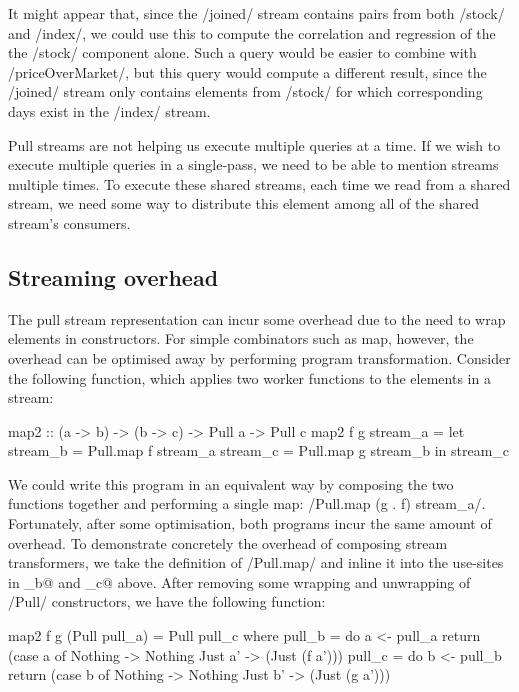 It might appear that, since the \Hs/joined/ stream contains pairs from both \Hs/stock/ and \Hs/index/, we could use this to compute the correlation and regression of the the \Hs/stock/ component alone.
Such a query would be easier to combine with \Hs/priceOverMarket/, but this query would compute a different result, since the \Hs/joined/ stream only contains elements from \Hs/stock/ for which corresponding days exist in the \Hs/index/ stream.

Pull streams are not helping us execute multiple queries at a time.
If we wish to execute multiple queries in a single-pass, we need to be able to mention streams multiple times.
To execute these shared streams, each time we read from a shared stream, we need some way to distribute this element among all of the shared stream's consumers.

\subsection{Streaming overhead}
\label{taxonomy/pull/streaming-overhead}

The pull stream representation can incur some overhead due to the need to wrap elements in \Hs@Maybe@ constructors.
For simple combinators such as map, however, the overhead can be optimised away by performing program transformation.
Consider the following function, which applies two worker functions to the elements in a stream:

\begin{haskell}
map2 :: (a -> b) -> (b -> c) -> Pull a -> Pull c
map2 f g stream_a
 = let stream_b = Pull.map f stream_a
       stream_c = Pull.map g stream_b
   in  stream_c
\end{haskell}

We could write this program in an equivalent way by composing the two functions together and performing a single map: \Hs/Pull.map (g . f) stream_a/.
Fortunately, after some optimisation, both programs incur the same amount of overhead.
To demonstrate concretely the overhead of composing stream transformers, we take the definition of \Hs/Pull.map/ and inline it into the use-sites in \Hs@stream_b@ and \Hs@stream_c@ above.
After removing some wrapping and unwrapping of \Hs/Pull/ constructors, we have the following function:

\begin{haskell}
map2 f g (Pull pull_a) = Pull pull_c
 where
  pull_b = do
    a <- pull_a
    return (case a of
             Nothing -> Nothing
             Just a' -> (Just (f a')))
  pull_c = do
    b <- pull_b
    return (case b of
             Nothing -> Nothing
             Just b' -> (Just (g a')))
\end{haskell}

